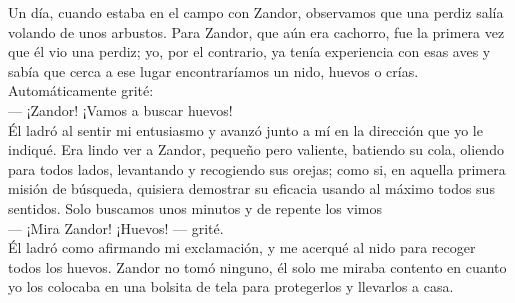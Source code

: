 Un día, cuando estaba en el campo con Zandor, observamos que una perdiz salía volando de unos arbustos. Para Zandor, que aún era cachorro, fue la primera vez que él vio una perdiz; yo, por el contrario, ya tenía experiencia con esas aves y sabía que cerca a ese lugar encontraríamos un nido, huevos o crías.
Automáticamente grité:\\\indent
--- ¡Zandor! ¡Vamos a buscar huevos!\\\indent
Él ladró al sentir mi entusiasmo y avanzó junto a mí en la dirección que yo le indiqué.
Era lindo ver a Zandor, pequeño pero valiente, batiendo su cola, oliendo para todos lados, levantando y recogiendo sus orejas; como si, en aquella primera misión de búsqueda, quisiera demostrar su eficacia usando al máximo todos sus sentidos.
Solo buscamos unos minutos y de repente los vimos\\\indent
--- ¡Mira Zandor! ¡Huevos! --- grité.\\\indent
Él ladró como afirmando mi exclamación, y me acerqué al nido para recoger todos los huevos. Zandor no tomó ninguno, él solo me miraba contento en cuanto yo los colocaba en una bolsita de tela para protegerlos y llevarlos a casa.

